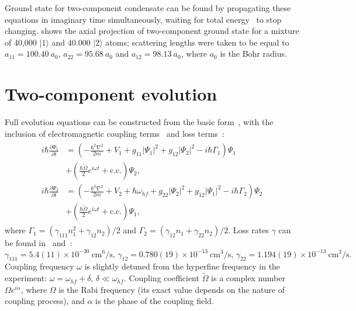 Ground state for two-component condensate can be found by propagating these equations in imaginary time simultaneously,
waiting for total energy~ to stop changing.
 shows the axial projection of two-component ground state for a mixture of 40,000 $\vert 1 \rangle$ and 40.000 $\vert 2 \rangle$ atoms;
scattering lengths were taken to be equal to $a_{11} = 100.40\ a_0$, $a_{22} = 95.68\ a_0$ and $a_{12} = 98.13\ a_0$, where $a_0$ is the Bohr radius.


\section{Two-component evolution}

Full evolution equations can be constructed from the basic form~,
with the inclusion of electromagnetic coupling terms~\cite{Pitaevskii2003}
and loss terms~\cite{Mertes2007}:
\begin{align}
\label{eqn:mean-field:two-comp-evolution-cgpes}
\begin{split}
	i \hbar \frac{\partial \Psi_1}{\partial t} & = \left(
		-\frac{\hbar^2 \nabla^2}{2 m} + V_1
		+ g_{11} \lvert \Psi_1 \rvert^2
		+ g_{12} \lvert \Psi_2 \rvert^2
		- i \hbar \Gamma_1
	\right) \Psi_1 \\
	& + \left(
		\frac{\hbar \tilde{\Omega}}{2} e^{i \omega t}
		+ \textrm{c.c.}
	\right) \Psi_2, \\
	i \hbar \frac{\partial \Psi_2}{\partial t} & = \left(
		-\frac{\hbar^2 \nabla^2}{2 m} + V_2 + \hbar \omega_{hf}
		+ g_{22} \lvert \Psi_2 \rvert^2
		+ g_{12} \lvert \Psi_1 \rvert^2
		- i \hbar \Gamma_2
	\right) \Psi_2 \\
	& + \left(
		\frac{\hbar \tilde{\Omega}}{2} e^{i \omega t}
		+ \textrm{c.c.}
	\right) \Psi_1,
\end{split}
\end{align}
where
$\Gamma_1 = \left( \gamma_{111} n_1^2 + \gamma_{12} n_2 \right) / 2$ and
$\Gamma_2 = \left( \gamma_{12} n_1 + \gamma_{22} n_2 \right) / 2$.
Loss rates $\gamma$ can be found in~\cite{Mertes2007} and~\cite{Burt1997}:
\[
	\gamma_{111} = 5.4(11) \times 10^{-30}\ \textrm{cm}^6/\textrm{s},\,
	\gamma_{12} = 0.780(19) \times 10^{-13}\ \textrm{cm}^3/\textrm{s},\,
	\gamma_{22} = 1.194(19) \times 10^{-13}\ \textrm{cm}^3/\textrm{s}.
\]
Coupling frequency $\omega$ is slightly detuned from the hyperfine frequency in the experiment:
$\omega = \omega_{hf} + \delta,\, \delta \ll \omega_{hf}$.
Coupling coefficient $\tilde{\Omega}$ is a complex number $\Omega e^{i \alpha}$,
where $\Omega$ is the Rabi frequency (its exact value depends on the nature of coupling process),
and $\alpha$ is the phase of the coupling field.

